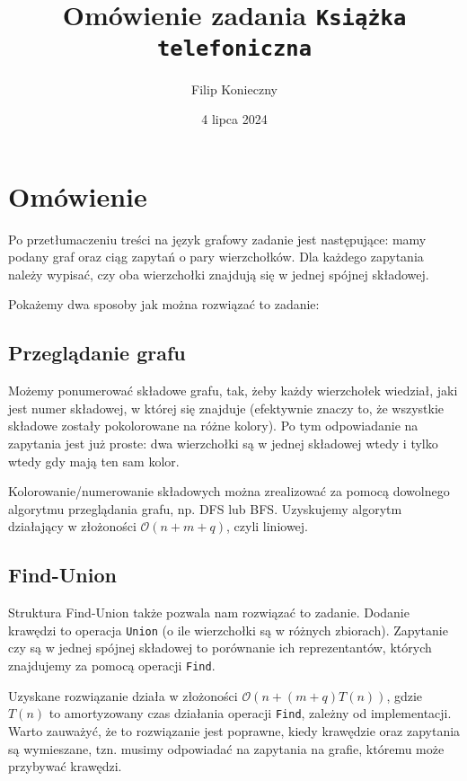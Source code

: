 \documentclass[]{article}
\author{Filip Konieczny}
\date{4 lipca 2024}
\title{Omówienie zadania \texttt{Książka telefoniczna}}
\newcommand{\Oh}[1]{\mathcal{O}{\left(#1\right)}}
\begin{document}
\maketitle
\section{Omówienie}

Po przetłumaczeniu treści na język grafowy zadanie jest następujące: mamy podany graf oraz ciąg zapytań o pary wierzchołków. Dla każdego zapytania należy wypisać, czy oba wierzchołki znajdują się w jednej spójnej składowej.

Pokażemy dwa sposoby jak można rozwiązać to zadanie:

\subsection*{Przeglądanie grafu}

Możemy ponumerować składowe grafu, tak, żeby każdy wierzchołek wiedział, jaki jest numer składowej, w której się znajduje (efektywnie znaczy to, że wszystkie składowe zostały pokolorowane na różne kolory). Po tym odpowiadanie na zapytania jest już proste: dwa wierzchołki są w jednej składowej wtedy i tylko wtedy gdy mają ten sam kolor.

Kolorowanie/numerowanie składowych można zrealizować za pomocą dowolnego algorytmu przeglądania grafu, np. DFS lub BFS. Uzyskujemy algorytm działający w złożoności $\Oh{n + m + q}$, czyli liniowej.

\subsection*{Find-Union}

Struktura Find-Union także pozwala nam rozwiązać to zadanie. Dodanie krawędzi to operacja \texttt{Union} (o ile wierzchołki są w różnych zbiorach). Zapytanie czy są w jednej spójnej składowej to porównanie ich reprezentantów, których znajdujemy za pomocą operacji \texttt{Find}.

Uzyskane rozwiązanie działa w złożoności $\Oh{n+(m+q)T(n)}$, gdzie $T(n)$ to amortyzowany czas działania operacji \texttt{Find}, zależny od implementacji. Warto zauważyć, że to rozwiązanie jest poprawne, kiedy krawędzie oraz zapytania są wymieszane, tzn. musimy odpowiadać na zapytania na grafie, któremu może przybywać krawędzi. 
\end{document}
